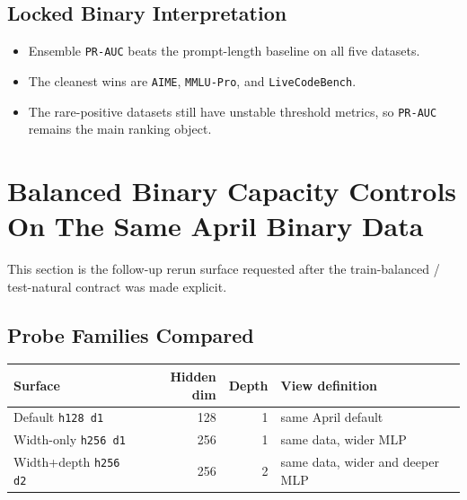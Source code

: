 \documentclass[11pt]{article}
\begin{document}
\subsection*{Locked Binary Interpretation}
\begin{itemize}[leftmargin=1.5em]
\item Ensemble \texttt{PR-AUC} beats the prompt-length baseline on all five datasets.
\item The cleanest wins are \texttt{AIME}, \texttt{MMLU-Pro}, and \texttt{LiveCodeBench}.
\item The rare-positive datasets still have unstable threshold metrics, so \texttt{PR-AUC} remains the main ranking object.
\end{itemize}

\section*{Balanced Binary Capacity Controls On The Same April Binary Data}
This section is the follow-up rerun surface requested after the train-balanced / test-natural contract was made explicit.

\subsection*{Probe Families Compared}
\begin{center}
\small
\begin{tabular}{@{}lrrl@{}}
\toprule
Surface & Hidden dim & Depth & View definition \\
\midrule
Default \texttt{h128 d1} & 128 & 1 & same April default \\
Width-only \texttt{h256 d1} & 256 & 1 & same data, wider MLP \\
Width+depth \texttt{h256 d2} & 256 & 2 & same data, wider and deeper MLP \\
\bottomrule
\end{tabular}
\end{center}
\end{document}
